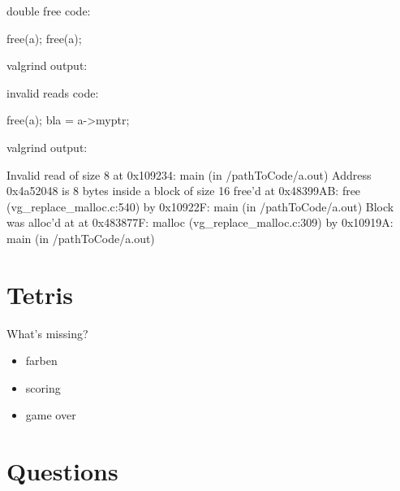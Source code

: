 \documentclass[10pt,graphics,aspectratio=169,table]{beamer}
\begin{document}
\begin{frame}[fragile]{double free}
code:
\begin{codeblock}
free(a);
free(a);
\end{codeblock}

valgrind output:

\end{frame}

\begin{frame}[fragile]{invalid reads}
code:
\begin{codeblock}
free(a);
bla = a->myptr;
\end{codeblock}

valgrind output:

\begin{codeblock}
Invalid read of size 8
   at 0x109234: main (in /pathToCode/a.out)
 Address 0x4a52048 is 8 bytes inside a block of size 16 free'd
   at 0x48399AB: free (vg_replace_malloc.c:540)
   by 0x10922F: main (in /pathToCode/a.out)
 Block was alloc'd at
   at 0x483877F: malloc (vg_replace_malloc.c:309)
   by 0x10919A: main (in /pathToCode/a.out)
\end{codeblock}
\end{frame}
\section{Tetris}
\begin{frame}{What's missing?}
\begin{itemize}
\item farben
\item scoring
\item game over
\end{itemize}
\end{frame}
\section{Questions}
\end{document}
